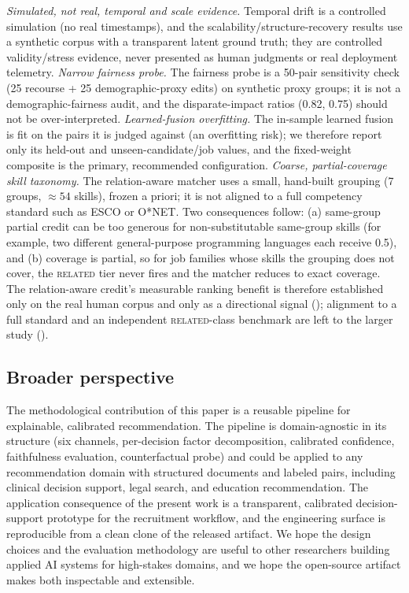 \emph{Simulated, not real, temporal and scale evidence.} Temporal drift is a controlled simulation (no real timestamps), and the scalability/structure-recovery results use a synthetic corpus with a transparent latent ground truth; they are controlled validity/stress evidence, never presented as human judgments or real deployment telemetry.
\emph{Narrow fairness probe.} The fairness probe is a 50-pair sensitivity check (25 recourse + 25 demographic-proxy edits) on synthetic proxy groups; it is not a demographic-fairness audit, and the disparate-impact ratios (0.82, 0.75) should not be over-interpreted.
\emph{Learned-fusion overfitting.} The in-sample learned fusion is fit on the pairs it is judged against (an overfitting risk); we therefore report only its held-out and unseen-candidate/job values, and the fixed-weight composite is the primary, recommended configuration.
\emph{Coarse, partial-coverage skill taxonomy.} The relation-aware matcher uses a small, hand-built grouping (7 groups, $\approx 54$ skills), frozen a priori; it is not aligned to a full competency standard such as ESCO or O*NET. Two consequences follow: (a) same-group partial credit can be too generous for non-substitutable same-group skills (for example, two different general-purpose programming languages each receive 0.5), and (b) coverage is partial, so for job families whose skills the grouping does not cover, the \textsc{related} tier never fires and the matcher reduces to exact coverage. The relation-aware credit's measurable ranking benefit is therefore established only on the real human corpus and only as a directional signal (); alignment to a full standard and an independent \textsc{related}-class benchmark are left to the larger study ().

\subsection{Broader perspective}\label{sec:6.3}
The methodological contribution of this paper is a reusable pipeline for explainable, calibrated recommendation.
The pipeline is domain-agnostic in its structure (six channels, per-decision factor decomposition, calibrated confidence, faithfulness evaluation, counterfactual probe) and could be applied to any recommendation domain with structured documents and labeled pairs, including clinical decision support, legal search, and education recommendation.
The application consequence of the present work is a transparent, calibrated decision-support prototype for the recruitment workflow, and the engineering surface is reproducible from a clean clone of the released artifact.
We hope the design choices and the evaluation methodology are useful to other researchers building applied AI systems for high-stakes domains, and we hope the open-source artifact makes both inspectable and extensible.
